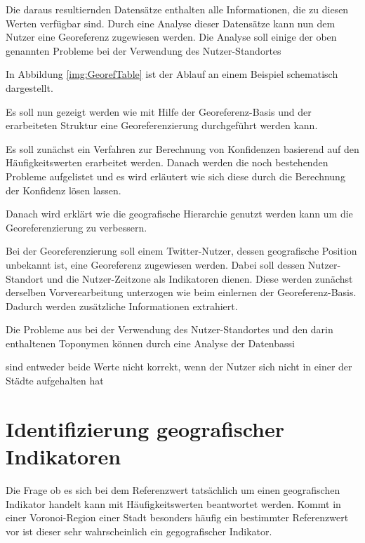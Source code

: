 		Die daraus resultiernden Datensätze enthalten alle Informationen, die zu diesen Werten verfügbar sind.
		Durch eine Analyse dieser Datensätze kann nun dem Nutzer eine Georeferenz zugewiesen werden.
		Die Analyse soll einige der oben genannten Probleme bei der Verwendung des Nutzer-Standortes

		In Abbildung \ref{img:GeorefTable} ist der Ablauf an einem Beispiel schematisch dargestellt.  

		Es soll nun gezeigt werden wie mit Hilfe der Georeferenz-Basis und der erarbeiteten Struktur eine Georeferenzierung durchgeführt werden kann.

		Es soll zunächst ein Verfahren zur Berechnung von Konfidenzen basierend auf den Häufigkeitswerten erarbeitet werden. 
		Danach werden die noch bestehenden Probleme aufgelistet und es wird erläutert wie sich diese durch die Berechnung der Konfidenz lösen lassen. 

		Danach wird erklärt wie die geografische Hierarchie genutzt werden kann um die Georeferenzierung zu verbessern.


		Bei der Georeferenzierung soll einem Twitter-Nutzer, dessen geografische Position unbekannt ist, eine Georeferenz zugewiesen werden.
		Dabei soll dessen Nutzer-Standort und die Nutzer-Zeitzone als Indikatoren dienen. 
		Diese werden zunächst derselben Vorverearbeitung unterzogen wie beim einlernen der Georeferenz-Basis.
		Dadurch werden zusätzliche Informationen extrahiert.


		Die Probleme aus bei der Verwendung des Nutzer-Standortes und den darin enthaltenen Toponymen können durch eine Analyse der Datenbassi 



				 sind entweder beide Werte nicht korrekt, wenn der Nutzer sich nicht in einer der Städte aufgehalten hat




		\section{Identifizierung geografischer Indikatoren}

			Die Frage ob es sich bei dem Referenzwert tatsächlich um einen geografischen Indikator handelt kann mit Häufigkeitswerten beantwortet werden.
			Kommt in einer Voronoi-Region einer Stadt besonders häufig ein bestimmter Referenzwert vor ist dieser sehr wahrscheinlich ein gegografischer Indikator.

